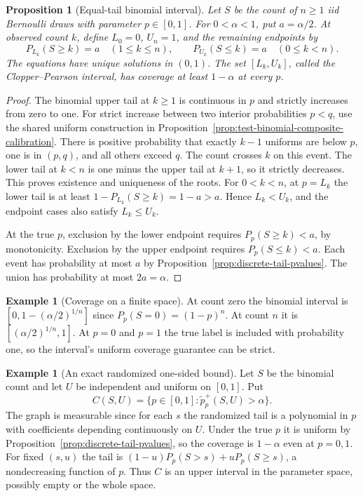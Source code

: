 \documentclass[11pt,oneside]{book}
\newtheorem{proposition}[theorem]{Proposition}
\theoremstyle{definition}
\newtheorem{example}[theorem]{Example}
\theoremstyle{remark}
\begin{document}
\begin{proposition}[Equal-tail binomial interval]
\label{prop:clopper-pearson-interval}
Let $S$ be the count of $n\geq1$ iid Bernoulli draws with
parameter $p\in[0,1]$. For $0<\alpha<1$, put $a=\alpha/2$.
At observed count $k$, define $L_0=0$, $U_n=1$, and the
remaining endpoints by
\[
P_{L_k}(S\geq k)=a\quad (1\leq k\leq n),\qquad
P_{U_k}(S\leq k)=a\quad (0\leq k<n).
\]
The equations have unique solutions in $(0,1)$. The set
$[L_k,U_k]$, called the Clopper--Pearson interval, has
coverage at least $1-\alpha$ at every $p$.
\end{proposition}
\begin{proof}
The binomial upper tail at $k\geq1$ is continuous in $p$ and
strictly increases from zero to one. For strict increase
between two interior probabilities $p<q$, use the shared
uniform construction in Proposition~\ref{prop:test-binomial-composite-calibration}.
There is positive probability that exactly $k-1$ uniforms
are below $p$, one is in $(p,q)$, and all others exceed $q$.
The count crosses $k$ on this event. The lower tail at
$k<n$ is one minus the upper tail at $k+1$, so it strictly
decreases. This proves existence and uniqueness of the roots.
For $0<k<n$, at $p=L_k$ the lower tail is at least
$1-P_{L_k}(S\geq k)=1-a>a$. Hence $L_k<U_k$, and the endpoint
cases also satisfy $L_k\leq U_k$.

At the true $p$, exclusion by the lower endpoint requires
$P_p(S\geq k)<a$, by monotonicity. Exclusion by the upper
endpoint requires $P_p(S\leq k)<a$. Each event has probability
at most $a$ by Proposition~\ref{prop:discrete-tail-pvalues}.
The union has probability at most $2a=\alpha$.
\end{proof}

\begin{example}[Coverage on a finite space]
\label{ex:confidence-binomial-boundary}
At count zero the binomial interval is
$[0,1-(\alpha/2)^{1/n}]$ since $P_p(S=0)=(1-p)^n$.
At count $n$ it is $[(\alpha/2)^{1/n},1]$.
At $p=0$ and $p=1$ the true label is included with probability
one, so the interval's uniform coverage guarantee can be
strict.
\end{example}

\begin{example}[An exact randomized one-sided bound]
\label{ex:confidence-binomial-randomized-bound}
Let $S$ be the binomial count and let $U$ be independent and
uniform on $[0,1]$. Put
\[
C(S,U)=\{p\in[0,1]:\widetilde p_p^+(S,U)>\alpha\}.
\]
The graph is measurable since for each $s$ the randomized
tail is a polynomial in $p$ with coefficients depending
continuously on $U$. Under the true $p$ it is uniform by
Proposition~\ref{prop:discrete-tail-pvalues}, so the coverage
is $1-\alpha$ even at $p=0,1$. For fixed $(s,u)$ the tail is
$(1-u)P_p(S>s)+uP_p(S\geq s)$, a nondecreasing function of
$p$. Thus $C$ is an upper interval in the parameter space,
possibly empty or the whole space.
\end{example}
\end{document}
